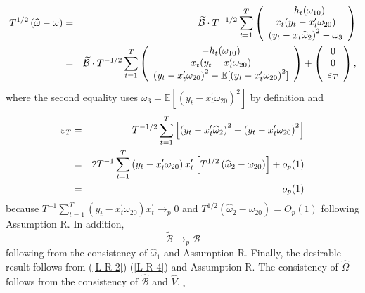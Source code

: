 \documentclass[11pt]{article}
\begin{document}
\begin{eqnarray}
T^{1/2}\left( \widehat{\omega }-\omega \right) &=&\widetilde{\mathcal{B}}%
\cdot T^{-1/2}\sum_{t=1}^{T}\left( 
\begin{array}{c}
-h_{t}(\omega _{10}) \\ 
x_{t}(y_{t}-x_{t}^{\prime }\omega _{20}) \\ 
\left( y_{t}-x_{t}\widehat{\omega }_{2}\right) ^{2}-\omega _{3}%
\end{array}%
\right)  \notag \\
&=&\widetilde{\mathcal{B}}\cdot T^{-1/2}\sum_{t=1}^{T}\left( 
\begin{array}{c}
-h_{t}(\omega _{10}) \\ 
x_{t}(y_{t}-x_{t}^{\prime }\omega _{20}) \\ 
\left( y_{t}-x_{t}^{\prime }\omega _{20}\right) ^{2}-\mathbb{E}[\left(
y_{t}-x_{t}^{\prime }\omega _{20}\right) ^{2}]%
\end{array}%
\right) +\left( 
\begin{array}{c}
0 \\ 
0 \\ 
\varepsilon _{T}%
\end{array}%
\right) ,  \label{L-R-2}
\end{eqnarray}%
where the second equality uses $\omega _{3}=\mathbb{E}[\left(
y_{t}-x_{t}^{\prime }\omega _{20}\right) ^{2}]$ by definition and 
\begin{eqnarray}
\varepsilon _{T} &=&T^{-1/2}\sum_{t=1}^{T}\left[ \left( y_{t}-x_{t}^{\prime }%
\widehat{\omega }_{2}\right) ^{2}-\left( y_{t}-x_{t}^{\prime }\omega
_{20}\right) ^{2}\right]  \notag \\
&=&2T^{-1}\sum_{t=1}^{T}\left( y_{t}-x_{t}^{\prime }\omega _{20}\right)
x_{t}^{\prime }\left[ T^{1/2}\left( \widehat{\omega }_{2}-\omega
_{20}\right) \right] +o_{p}(1)  \notag \\
&=&o_{p}(1)  \label{L-R-3}
\end{eqnarray}%
because $T^{-1}\sum_{t=1}^{T}\left( y_{t}-x_{t}^{\prime }\omega _{20}\right)
x_{t}^{\prime }\rightarrow _{p}0$ and $T^{1/2}(\widehat{\omega }_{2}-\omega
_{20})=O_{p}(1)$ following Assumption R. In addition, 
\begin{equation}
\widetilde{\mathcal{B}}\rightarrow _{p}\mathcal{B}  \label{L-R-4}
\end{equation}%
following from the consistency of $\widehat{\omega }_{1}$ and Assumption R.
Finally, the desirable result follows from (\ref{L-R-2})-(\ref{L-R-4}) and
Assumption R. The consistency of $\widehat{\Omega }$ follows from the
consistency of $\widehat{\mathcal{B}}$ and $\widehat{V}.$ $_{\square }$
\end{document}
